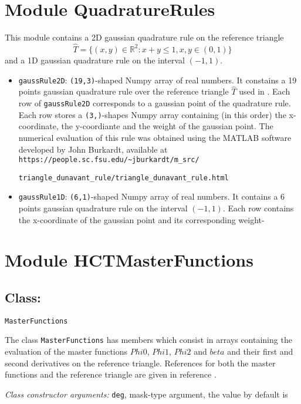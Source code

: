 \documentclass{amsart}
\theoremstyle{plain}
\theoremstyle{definition}
\theoremstyle{remark}
\numberwithin{equation}{section}
\newcommand{\R}{\mathbb R}
\begin{document}
\section{Module QuadratureRules}

This module contains a 2D gaussian quadrature rule on the reference triangle $$\hat{T}=\{(x,y)\in \R^2: x+y\leq 1, x,y\in(0,1)\}$$ and a 1D gaussian quadrature rule on the interval $(-1,1)$.
\begin{itemize}
\item \verb|gaussRule2D|: \verb|(19,3)|-shaped Numpy array of real numbers. It constains a 19 points gaussian quadrature rule over the reference triangle $\hat{T}$ used in \cite{Meyer}. Each row of \verb|gaussRule2D| corresponds to a gaussian point of the quadrature rule. Each row stores a \verb|(3,)|-shapes Numpy array containing (in this order) the x-coordinate, the y-coordiante and the weight of the gaussian point. The numerical evaluation of this rule was obtained using the MATLAB software developed by  John Burkardt,  available at  \verb|https://people.sc.fsu.edu/~jburkardt/m_src/|

\verb|triangle_dunavant_rule/triangle_dunavant_rule.html|
\item \verb|gaussRule1D|: \verb|(6,1)|-shaped Numpy array of real numbers. It contains a 6 points gaussian quadrature rule on the interval $(-1,1)$. Each row contains the x-coordinate of the gaussian point and its corresponding weight-
\end{itemize}

\section{Module HCTMasterFunctions}

\subsection{Class:} \verb|MasterFunctions|

The class \verb|MasterFunctions| has members which consist in arrays containing the evaluation of the master functions $Phi0$, $Phi1$, $Phi2$ and $beta$ and their first and second derivatives on the reference triangle. References for both the master functions and the reference triangle are given in reference \cite{Meyer}.

\textit{Class constructor arguments:} \verb|deg|, mask-type argument, the value by default is
\end{document}
